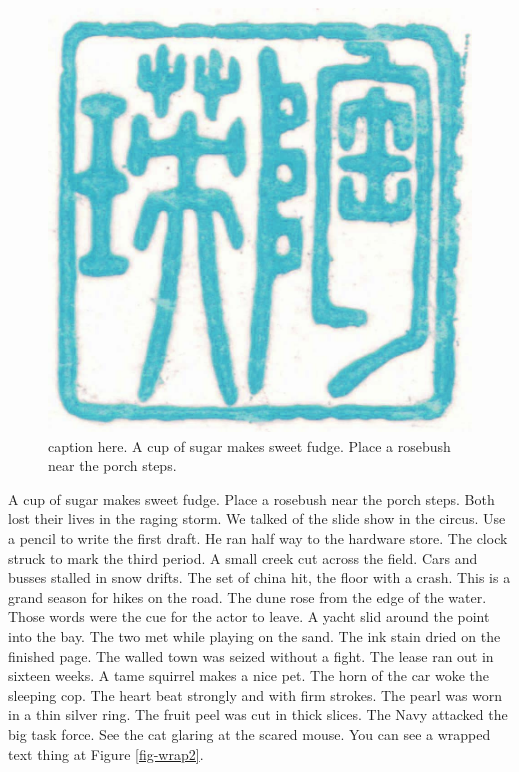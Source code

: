 \documentclass[
  letterpaper,
  DIV=11,
  numbers=noendperiod]{scrartcl}
\begin{document}
\begin{figure}
\centering
\includegraphics[width=0.7\linewidth]{stamp1b.jpg}
\caption{\label{fig-wrap}caption here. A cup of sugar makes sweet fudge. Place a rosebush near the porch steps.}
\vspace{-3pt}
\end{figure}

A cup of sugar makes sweet fudge. Place a rosebush near the porch steps.
Both lost their lives in the raging storm. We talked of the slide show
in the circus. Use a pencil to write the first draft. He ran half way to
the hardware store. The clock struck to mark the third period. A small
creek cut across the field. Cars and busses stalled in snow drifts. The
set of china hit, the floor with a crash. This is a grand season for
hikes on the road. The dune rose from the edge of the water. Those words
were the cue for the actor to leave. A yacht slid around the point into
the bay. The two met while playing on the sand. The ink stain dried on
the finished page. The walled town was seized without a fight. The lease
ran out in sixteen weeks. A tame squirrel makes a nice pet. The horn of
the car woke the sleeping cop. The heart beat strongly and with firm
strokes. The pearl was worn in a thin silver ring. The fruit peel was
cut in thick slices. The Navy attacked the big task force. See the cat
glaring at the scared mouse. You can see a wrapped text thing at Figure
\ref{fig-wrap2}.
\end{document}

